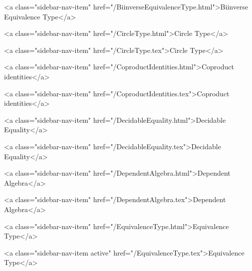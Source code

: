       
        
          <a class="sidebar-nav-item" href="/BiinverseEquivalenceType.html">Biinverse Equivalence Type</a>
        
      
    
      
        
          <a class="sidebar-nav-item" href="/CircleType.html">Circle Type</a>
        
      
    
      
        
          <a class="sidebar-nav-item" href="/CircleType.tex">Circle Type</a>
        
      
    
      
        
          <a class="sidebar-nav-item" href="/CoproductIdentities.html">Coproduct identities</a>
        
      
    
      
        
          <a class="sidebar-nav-item" href="/CoproductIdentities.tex">Coproduct identities</a>
        
      
    
      
        
          <a class="sidebar-nav-item" href="/DecidableEquality.html">Decidable Equality</a>
        
      
    
      
        
          <a class="sidebar-nav-item" href="/DecidableEquality.tex">Decidable Equality</a>
        
      
    
      
        
          <a class="sidebar-nav-item" href="/DependentAlgebra.html">Dependent Algebra</a>
        
      
    
      
        
          <a class="sidebar-nav-item" href="/DependentAlgebra.tex">Dependent Algebra</a>
        
      
    
      
        
          <a class="sidebar-nav-item" href="/EquivalenceType.html">Equivalence Type</a>
        
      
    
      
        
          <a class="sidebar-nav-item active" href="/EquivalenceType.tex">Equivalence Type</a>
        
